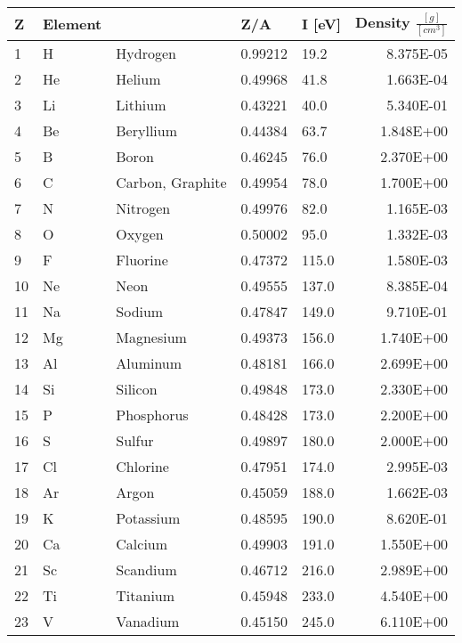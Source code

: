 \begin{tabular}{l|l|l|l|l|r}

Z & Element &   & Z/A & I [eV] & Density $\frac{[g]}{[cm^3]}$ \\
\hline
1 &	H &	 	Hydrogen &	 	0.99212 &	 	19.2 &	 	8.375E-05 \\
2 &	He &	Helium &	0.49968 &	41.8 &	1.663E-04 \\
3 & Li &	Lithium &	0.43221 &	40.0 &	5.340E-01 \\
4 &	Be &	Beryllium &	0.44384 &	63.7 &	1.848E+00 \\ 
5 &	B &	Boron &	0.46245 &	76.0 &	2.370E+00 \\
6 &	C &	Carbon, Graphite &	0.49954 &	78.0 &	1.700E+00 \\
7 &	N &	Nitrogen &	0.49976 &	82.0 &	1.165E-03 \\
8 &	O &	Oxygen &	0.50002 &	95.0 &	1.332E-03 \\
9 &	F &	Fluorine &	0.47372 &	115.0 &	1.580E-03 \\
10 &	Ne &	Neon &	0.49555 &	137.0 &	8.385E-04 \\
11 &	Na &	Sodium &	0.47847 &	149.0 &	9.710E-01 \\
12 &	Mg &	Magnesium &	0.49373 &	156.0 &	1.740E+00 \\
13 &	Al &	Aluminum &	0.48181 &	166.0 &	2.699E+00 \\
14 &	Si &	Silicon &	0.49848 &	173.0 &	2.330E+00 \\
15 &	P &	Phosphorus &	0.48428 &	173.0 &	2.200E+00 \\
16 &	S &	Sulfur &	0.49897 &	180.0 &	2.000E+00 \\
17 &	Cl &	Chlorine &	0.47951 &	174.0 &	2.995E-03 \\
18 &	Ar &	Argon &	0.45059 &	188.0 &	1.662E-03 \\
19 &	K &	Potassium &	0.48595 &	190.0 &	8.620E-01 \\
20 &	Ca &	Calcium &	0.49903 &	191.0 &	1.550E+00 \\
21 &	Sc &	Scandium &	0.46712 &	216.0 &	2.989E+00 \\
22 &	Ti &	Titanium &	0.45948 &	233.0 &	4.540E+00 \\
23 &	V &	Vanadium &	0.45150 &	245.0 &	6.110E+00 \\

\end{tabular}

